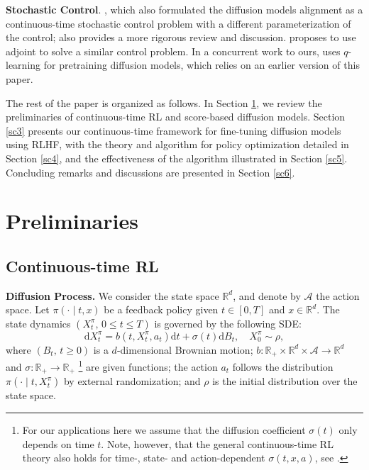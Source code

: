 \documentclass{article}
\theoremstyle{plain}
\theoremstyle{definition}
\theoremstyle{remark}
\begin{document}
\textbf{Stochastic Control}. \cite{uehara2024continuous-fine-tune}, which also formulated the diffusion models alignment as a continuous-time stochastic control problem with a different parameterization of the control; \cite{Tang24} also provides a more rigorous review and discussion. \cite{domingo2024adjoint} proposes to use adjoint to solve a similar control problem. 
In a concurrent work to ours,  \cite{gao2024reward} uses $q$-learning \cite{jia2022q_learning} for pretraining diffusion models,
which relies on an earlier version \cite{zhao2024scores} of this paper.

The rest of the paper is organized as follows. In Section \ref{sc2}, we review the preliminaries of continuous-time RL and score-based diffusion models. Section \ref{sc3} presents our continuous-time  framework for fine-tuning diffusion models using RLHF, with the theory and algorithm for policy optimization detailed in Section \ref{sc4}, and the effectiveness of the algorithm illustrated in Section \ref{sc5}. Concluding remarks and discussions are presented in Section \ref{sc6}.


\section{Preliminaries}
\label{sc2}
\subsection{Continuous-time RL}
\textbf{Diffusion Process.} We consider the state space $\mathbb{R}^d$, and denote by $\mathcal{A}$ the action space. 
Let $\pi(\cdot \mid t,x)$ be a {feedback} policy given $t\in [0,T]$ and $x \in \mathbb{R}^d$. 
The state dynamics $(X^\pi_t, \, 0 \leq t \leq T)$ is governed by the following SDE:
\begin{equation}
\label{SDE_dynamic}
\mathrm{d} X_t^\pi=b\left(t, X_t^\pi, a_t\right) \mathrm{d} t+\sigma(t) \mathrm{d} B_t,\quad X^\pi_0\sim \rho,
\end{equation}
where $(B_t, \, t \ge 0)$ is a $d$-dimensional Brownian motion;
$b: \mathbb{R}_+ \times \mathbb{R}^d \times \mathcal{A} \to \mathbb{R}^d$ and $\sigma: \mathbb{R}_+ \to \mathbb{R}_+$ \footnote{For our applications here we assume that the diffusion coefficient $\sigma(t)$ only depends on time $t$. 
Note, however, that the general continuous-time RL theory also holds for time-, state- and action-dependent $\sigma(t,x,a)$, see \cite{jia2022policy_evaluation,jia2022policy_gradient}.}
are given functions;
the action $a_t$ follows the distribution $\pi\left(\cdot \mid t, X^\pi_t\right)$ by external randomization;
and $\rho$ is the initial  distribution over the state space. 
\end{document}
